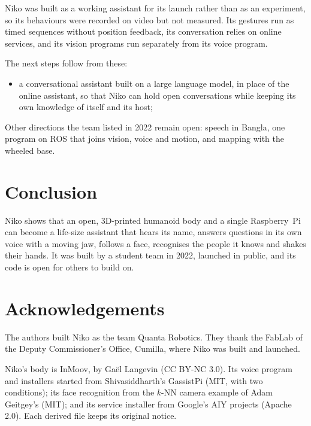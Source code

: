 \documentclass[11pt]{article}
\begin{document}
Niko was built as a working assistant for its launch rather than as an experiment, so its behaviours were recorded on video but not measured. Its gestures run as timed sequences without position feedback, its conversation relies on online services, and its vision programs run separately from its voice program.

The next steps follow from these:
\begin{itemize}
  \item a conversational assistant built on a large language model, in place of the online assistant, so that Niko can hold open conversations while keeping its own knowledge of itself and its host;
\end{itemize}

Other directions the team listed in 2022 remain open: speech in Bangla, one program on ROS that joins vision, voice and motion, and mapping with the wheeled base.

\section{Conclusion}

Niko shows that an open, 3D-printed humanoid body and a single Raspberry~Pi can become a life-size assistant that hears its name, answers questions in its own voice with a moving jaw, follows a face, recognises the people it knows and shakes their hands. It was built by a student team in 2022, launched in public, and its code is open for others to build on.

\section*{Acknowledgements}

The authors built Niko as the team Quanta Robotics. They thank the FabLab of the Deputy Commissioner's Office, Cumilla, where Niko was built and launched.

Niko's body is InMoov, by Gaël Langevin (CC BY-NC 3.0). Its voice program and installers started from Shivasiddharth's GassistPi (MIT, with two conditions); its face recognition from the $k$-NN camera example of Adam Geitgey's  (MIT); and its service installer from Google's AIY projects (Apache 2.0). Each derived file keeps its original notice.
\end{document}
